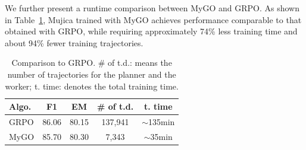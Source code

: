 We further present a runtime comparison between MyGO and GRPO.
As shown in Table~\ref{tab:grpo_vs_grpo}, Mujica trained with MyGO achieves performance comparable to that obtained with GRPO, while requiring approximately 74\% less training time and about 94\% fewer training trajectories.


\begin{table}[h!]
\centering
\caption{Comparison to GRPO. \# of t.d.: means the number of trajectories for the planner and the worker; t. time: denotes the total training time.}
\label{tab:grpo_vs_grpo}
\begin{tabular}{lcccc}
\hline
Algo. & F1 & EM & \# of t.d. & t. time\\
\hline
GRPO & 86.06 & 80.15 & 137,941 & $\sim$135min \\
MyGO & 85.70 & 80.30 & 7,343 & $\sim$35min \\
\hline
\end{tabular}
\end{table}








